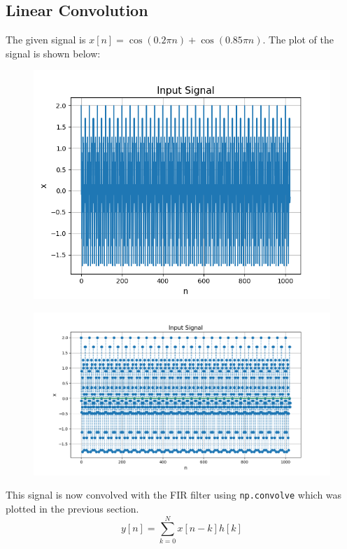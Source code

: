\documentclass[12pt, a4paper]{article}
\begin{document}
\subsection{Linear Convolution}
The given signal is $x[n] = \cos(0.2\pi n) + \cos(0.85\pi n)$. The plot of the signal is shown below:
\begin{figure}[H]
    \centering
    \includegraphics[scale = 0.8]{Figure_2.png}
    \label{fig:sample}
\end{figure}
\begin{figure}[H]
    \centering
    \includegraphics[scale = 0.6]{Figure_2b.png}
    \label{fig:sample}
\end{figure}
This signal is now convolved with the FIR filter using \texttt{np.convolve} which was plotted in the previous section. 
\begin{equation*}
    y[n] = \sum_{k=0}^{N} x[n-k]h[k]
\end{equation*}
\end{document}
